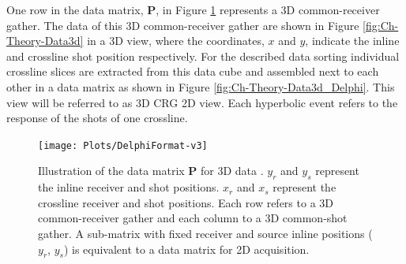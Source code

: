 
One row in the data matrix, $\mathbf{P}$, in Figure \ref{fig:Ch-Theory-DelphiFormat} represents  a 3D common-receiver gather. The data of this 3D common-receiver gather are shown in Figure \ref{fig:Ch-Theory-Data3d} in a 3D view, where the coordinates, $x$ and $y$, indicate the inline and crossline shot position respectively. For the described data sorting individual crossline slices are extracted from this data cube and assembled next to each other in a data matrix as shown in Figure \ref{fig:Ch-Theory-Data3d_Delphi}. This view will be referred to as 3D CRG 2D view. Each hyperbolic event refers to the response of the shots of one crossline.

\begin{figure}
	\centering
	\texttt{[image: Plots/DelphiFormat-v3]}
	\caption{Illustration of the data matrix $\mathbf{P}$ for 3D data \citep{Delphi-Format}. $y_r$ and $y_s$ represent the inline receiver and shot positions. $x_r$ and $x_s$ represent the crossline receiver and shot positions. Each row refers to a 3D common-receiver gather and each column to a 3D common-shot gather. A sub-matrix with fixed receiver and source inline positions ($y_r$, $y_s$) is equivalent to a data matrix for 2D acquisition.}
	\label{fig:Ch-Theory-DelphiFormat}
\end{figure}


